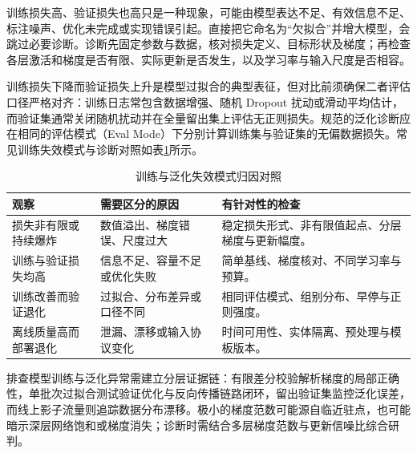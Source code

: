 \documentclass[../textbook.tex]{subfiles}
\begin{document}
训练损失高、验证损失也高只是一种现象，可能由模型表达不足、有效信息不足、标注噪声、优化未完成或实现错误引起。直接把它命名为“欠拟合”并增大模型，会跳过必要诊断。诊断先固定参数与数据，核对损失定义、目标形状及梯度；再检查各层激活和梯度是否有限、实际更新是否发生，以及学习率与输入尺度是否相容。

训练损失下降而验证损失上升是模型过拟合的典型表征，但对比前须确保二者评估口径严格对齐：训练日志常包含数据增强、随机 Dropout 扰动或滑动平均估计，而验证集通常关闭随机扰动并在全量留出集上评估无正则损失。规范的泛化诊断应在相同的评估模式（Eval Mode）下分别计算训练集与验证集的无偏数据损失。常见训练失效模式与诊断对照如表\ref{tab:opt-failure-diagnosis}所示。

\begin{table}[htbp]
\centering
\caption{训练与泛化失效模式归因对照}
\label{tab:opt-failure-diagnosis}
\begin{tabularx}{\linewidth}{p{31mm}XX}
\toprule
观察 & 需要区分的原因 & 有针对性的检查\\\midrule
损失非有限或持续爆炸 & 数值溢出、梯度错误、尺度过大 & 稳定损失形式、非有限值起点、分层梯度与更新幅度。\\
训练与验证损失均高 & 信息不足、容量不足或优化失败 & 简单基线、梯度核对、不同学习率与预算。\\
训练改善而验证退化 & 过拟合、分布差异或口径不同 & 相同评估模式、组别分布、早停与正则强度。\\
离线质量高而部署退化 & 泄漏、漂移或输入协议变化 & 时间可用性、实体隔离、预处理与模板版本。\\
\bottomrule
\end{tabularx}
\end{table}
排查模型训练与泛化异常需建立分层证据链：有限差分校验解析梯度的局部正确性，单批次过拟合测试验证优化与反向传播链路闭环，留出验证集监控泛化误差，而线上影子流量则追踪数据分布漂移。极小的梯度范数可能源自临近驻点，也可能暗示深层网络饱和或梯度消失；诊断时需结合多层梯度范数与更新信噪比综合研判。


\chapterreferences
\myendchapterdocument
\end{document}

